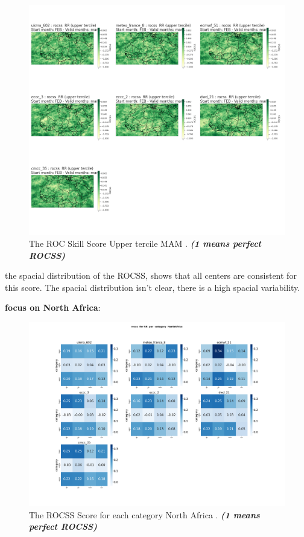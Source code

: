 \begin{figure}[H]
    \centering
    \includegraphics[scale=0.3]{plots/prob/rocss/rocss_mam_RR_upper.png}
    \caption{The ROC Skill Score Upper tercile MAM    . \textbf{\textit{(1 means perfect ROCSS)}}}
\end{figure}

the spacial distribution of the ROCSS, shows that all centers are consistent for this score. The spacial distribution isn't clear, there is a high spacial variability.

\vspace{1.5cm}
\textbf{focus on North Africa}:

\begin{figure}[H]
    \centering
    \includegraphics[scale=0.25]{plots/prob/rocss/rocss_RR_category_NorthAfrica.png}
    \caption{The ROCSS Score for each category North Africa . \textbf{\textit{(1 means perfect ROCSS)}}}
\end{figure}


